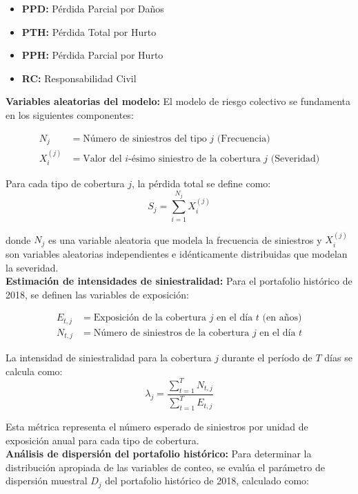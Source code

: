 \begin{itemize}
    \item \textbf{PPD:} Pérdida Parcial por Daños
    \item \textbf{PTH:} Pérdida Total por Hurto
    \item \textbf{PPH:} Pérdida Parcial por Hurto
    \item \textbf{RC:} Responsabilidad Civil
\end{itemize}

\textbf{Variables aleatorias del modelo:} El modelo de riesgo colectivo se fundamenta en los siguientes componentes:

\begin{align*}
N_j &= \text{Número de siniestros del tipo } j \text{ (Frecuencia)} \\
X_{i}^{(j)} &= \text{Valor del $i$-ésimo siniestro de la cobertura } j \text{ (Severidad)}
\end{align*}

Para cada tipo de cobertura $j$, la pérdida total se define como:
\begin{equation*}
S_j = \sum_{i=1}^{N_j} X_i^{(j)}
\end{equation*}

donde $N_j$ es una variable aleatoria que modela la frecuencia de siniestros y $X_i^{(j)}$ son variables aleatorias independientes e idénticamente distribuidas que modelan la severidad.\\

\textbf{Estimación de intensidades de siniestralidad:} Para el portafolio histórico de 2018, se definen las variables de exposición:

\begin{align*}
E_{t,j} &= \text{Exposición de la cobertura } j \text{ en el día } t \text{ (en años)} \\
N_{t,j} &= \text{Número de siniestros de la cobertura } j \text{ en el día } t
\end{align*}

La intensidad de siniestralidad para la cobertura $j$ durante el período de $T$ días se calcula como:
\begin{equation*}
\lambda_j = \frac{\sum_{t=1}^{T} N_{t,j}}{\sum_{t=1}^{T} E_{t,j}}
\end{equation*}

Esta métrica representa el número esperado de siniestros por unidad de exposición anual para cada tipo de cobertura.\\

\textbf{Análisis de dispersión del portafolio histórico:} Para determinar la distribución apropiada de las variables de conteo, se evalúa el parámetro de dispersión muestral $D_j$ del portafolio histórico de 2018, calculado como:

